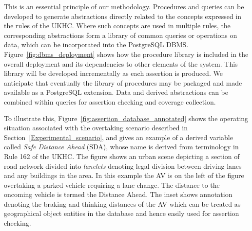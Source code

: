 This is an essential principle of our methodology. Procedures and queries can be developed to generate abstractions directly related to the concepts expressed in the rules of the UKHC. 
Where such concepts are used in multiple rules, the corresponding abstractions form a library of common queries or operations on data, which can be incorporated into the PostgreSQL DBMS. %
%
Figure~\ref{fig:dbms_deployment} shows how the procedure library is included in the overall deployment and its dependencies to other elements of the system. This library will be developed incrementally as each assertion is produced. We anticipate that eventually the library of procedures may be packaged and made available as a PostgreSQL extension. 
%
Data and derived abstractions can be combined within queries for assertion checking and coverage collection. 
%
%        
%

To illustrate this, Figure~\ref{fig:assertion_database_annotated} shows the operating situation associated with the overtaking scenario described in Section~\ref{Experimental_scenario}, and gives an example of a derived variable called \emph{Safe Distance Ahead} (SDA), whose name is derived from terminology in Rule 162 of the UKHC. The figure shows an urban scene depicting a section of road network divided into \emph{lanelets} denoting legal division between driving lanes and any buildings in the area. In this example the AV is on the left of the figure overtaking a parked vehicle requiring a lane change. The distance to the oncoming vehicle is termed the Distance Ahead. The inset shows annotation denoting the braking and thinking distances of the AV which can be treated as geographical object entities in the database and hence easily used for assertion checking. 

